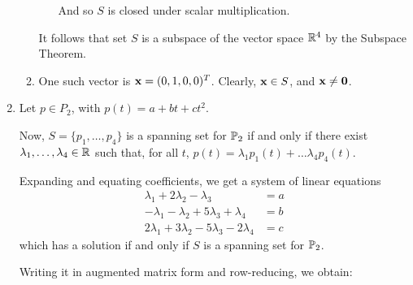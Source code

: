 \begin{enumerate}
\begin{enumerate}
\begin{itemize}
                        And so $S$ is closed under scalar multiplication.
                \end{itemize}

                It follows that set $S$ is a subspace of the vector
                space $\R^4$ by the Subspace Theorem.

            \item
                One such vector is $\x = (0, 1, 0, 0)^T$.
                Clearly, $\x \in S$, and $\x \neq \v{0}$.
        \end{enumerate}

    \item
        Let $p \in P_2$, with $p(t) = a + bt + ct^2$.

        Now, $S = \{p_1, \dots, p_4\}$ is a spanning set for $\P_2$ if
        and only if there exist $\lambda_1, \dots, \lambda_4 \in \R$
        such that, for all $t$, $p(t) = \lambda_1 p_1(t) + \dots
        \lambda_4 p_4(t)$.

        Expanding and equating coefficients, we get a system of linear
        equations
        \begin{align*}
            \lambda_1 + 2\lambda_2 - \lambda_3 &= a \\
            -\lambda_1 - \lambda_2 + 5\lambda_3 + \lambda_4 &= b \\
            2\lambda_1 + 3\lambda_2 - 5\lambda_3 - 2\lambda_4 &= c
        \end{align*}
        which has a solution if and only if $S$ is a spanning set for
        $\P_2$.

        Writing it in augmented matrix form and row-reducing, we obtain:


\end{enumerate}
